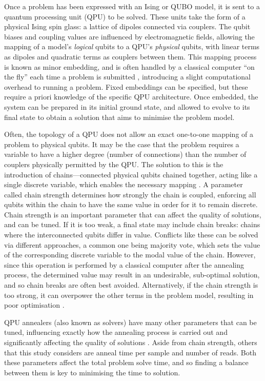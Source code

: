 \documentclass[twocolumn]{article}
\theoremstyle{definition}
\begin{document}
Once a problem has been expressed with an Ising or QUBO model, it is sent to a quantum processing unit (QPU) to be solved. These units take the form of a physical Ising spin glass: a lattice of dipoles connected via couplers. The qubit biases and coupling values are influenced by electromagnetic fields, allowing the mapping of a model's \emph{logical} qubits to a QPU's \emph{physical} qubits, with linear terms as dipoles and quadratic terms as couplers between them. This mapping process is known as minor embedding, and is often handled by a classical computer ``on the fly'' each time a problem is submitted \cite{dwave_embedding}, introducing a slight computational overhead to running a problem. Fixed embeddings can be specified, but these require a priori knowledge of the specific QPU architecture. Once embedded, the system can be prepared in its initial ground state, and allowed to evolve to its final state to obtain a solution that aims to minimise the problem model.

Often, the topology of a QPU does not allow an exact one-to-one mapping of a problem to physical qubits. It may be the case that the problem requires a variable to have a higher degree (number of connections) than the number of couplers physically permitted by the QPU. The solution to this is the introduction of chains---connected physical qubits chained together, acting like a single discrete variable, which enables the necessary mapping \cite{dwave_embedding}. A parameter called chain strength determines how strongly the chain is coupled, enforcing all qubits within the chain to have the same value in order for it to remain discrete. Chain strength is an important parameter that can affect the quality of solutions, and can be tuned. If it is too weak, a final state may include chain breaks: chains where the interconnected qubits differ in value. Conflicts like these can be solved via different approaches, a common one being majority vote, which sets the value of the corresponding discrete variable to the modal value of the chain. However, since this operation is performed by a classical computer after the annealing process, the determined value may result in an undesirable, sub-optimal solution, and so chain breaks are often best avoided. Alternatively, if the chain strength is too strong, it can overpower the other terms in the problem model, resulting in poor optimisation \cite{dwave_embedguidance}.

QPU annealers (also known as solvers) have many other parameters that can be tuned, influencing exactly how the annealing process is carried out and significantly affecting the quality of solutions \cite{dwave_qpu}. Aside from chain strength, others that this study considers are anneal time per sample and number of reads. Both these parameters affect the total problem solve time, and so finding a balance between them is key to minimising the time to solution.
\end{document}
